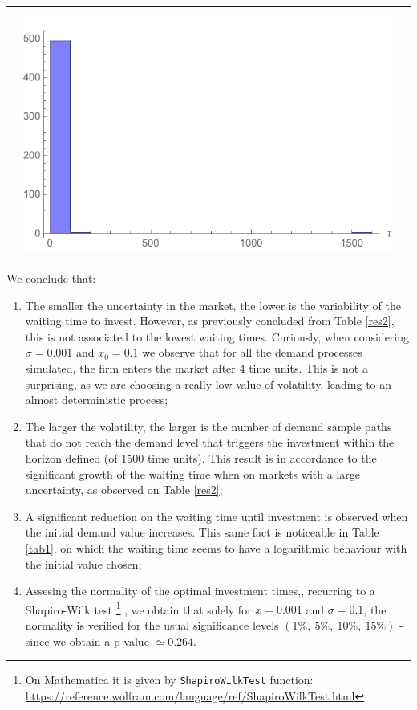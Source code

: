 \begin{table}[!htb]
\begin{tabular}{c|c|c}
\begin{minipage}{.45\textwidth}
		\end{minipage}
		& \begin{minipage}{.45\textwidth}
			\includegraphics[width=\linewidth]{StopTime/x01o5.pdf}
		\end{minipage} \\ \hline
	\end{tabular}
	\label{hist}
\end{table}


We conclude that:
\begin{enumerate}
	\item The smaller the uncertainty in the market, the lower is the variability of the waiting time to invest.
	However, as previously concluded from Table \ref{res2}, this is not associated to the lowest waiting times.
	Curiously, when considering $\sigma=0.001$ and $x_0=0.1$ we observe that for all the demand processes simulated, the firm enters the market after 4 time units. This is not a surprising, as we are choosing a really low value of volatility, leading to an almost deterministic process;
	
	\item The larger the volatility, the larger is the number of demand sample paths that do not reach the demand level that triggers the investment within the horizon defined (of 1500 time units). This result is in accordance to the significant growth of the waiting time when on markets with a large uncertainty, as observed on Table \ref{res2};
	
	\item A significant reduction on the waiting time until investment is observed when the initial demand value increases. This same fact is noticeable in Table \ref{tab1}, on which the waiting time seems to have a logarithmic behaviour with the initial value chosen;
	
	\item Assesing the normality of the optimal investment times,, recurring to a Shapiro-Wilk test \cite{sw}\footnote{On Mathematica it is given by \texttt{ShapiroWilkTest} function: \url{https://reference.wolfram.com/language/ref/ShapiroWilkTest.html}}
		, we obtain that solely for $x=0.001$ and $\sigma=0.1$, the normality is verified for the usual significance levels $(1\%, \ 5\%, \ 10\%, \ 15\%)$ - since we obtain a p-value $\simeq 0.264$.
\end{enumerate}


